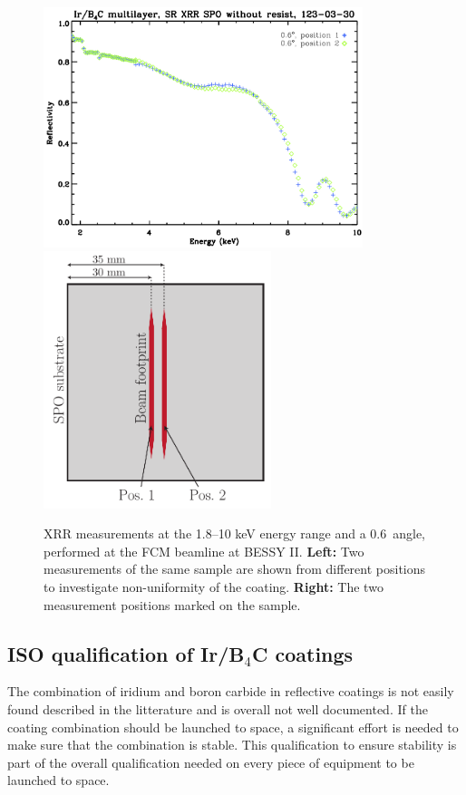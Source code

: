 \begin{figure}[!h]
  \center
 \includegraphics[height=7cm]{figures/athena/coating_on_spo/ml_irb4c_nores.jpg}
 \includegraphics[height=7.5cm]{figures/athena/coating_on_spo/SPO_bessy_positions.pdf}
\caption{\footnotesize XRR measurements at the 1.8--10 keV energy range and a 0.6\degr\ angle, performed at the FCM beamline at BESSY II. \textbf{Left:} Two measurements of the same sample are shown from different positions to investigate non-uniformity of the coating. \textbf{Right:} The two measurement positions marked on the sample.}\label{fig:spo_bessy}
\end{figure}


\subsection{ISO qualification of Ir/B$_4$C coatings}\label{sec:qa_test}
The combination of iridium and boron carbide in reflective coatings is not easily found described in the litterature and is overall not well documented. If the coating combination should be launched to space, a significant effort is needed to make sure that the combination is stable. This qualification to ensure stability is part of the overall qualification needed on every piece of equipment to be launched to space.

